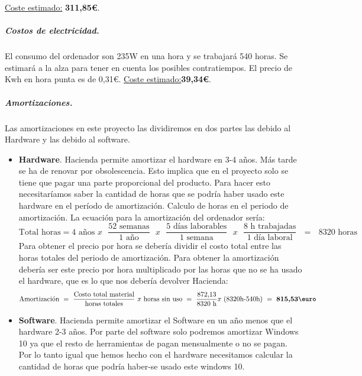 \documentclass[12pt]{article}
\begin{document}
    \underline{Coste estimado:} \textbf{311,85\euro}.
    \subparagraph{Costos de electricidad.} El consumo del ordenador son 235W en una hora y se trabajará 540 horas. Se estimará a la alza para tener en cuenta los posibles contratiempos. El precio de Kwh en hora punta es de 0,31\euro. \underline{Coste estimado:}\textbf{39,34\euro}.
    \subparagraph{Amortizaciones.}
    Las amortizaciones en este proyecto las dividiremos en dos partes las debido al Hardware y las debido al software. 
    \begin{itemize}
            \item \textbf{Hardware}. Hacienda permite amortizar el hardware en 3-4 años. Más tarde se ha de renovar por obsolescencia. Esto implica que en el proyecto solo se tiene que pagar una parte proporcional del producto. Para hacer esto necesitaríamos saber la cantidad de horas que se podría haber usado este hardware en el período de amortización. Calculo de horas en el periodo de amortización.
            La ecuación para la amortización del ordenador sería:
            \begin{equation*}
                \text{Total horas} = \text{4 años }  x\text{ }  \frac{\text{52 semanas}}{\text{1 año}} \text{ }x\text{ } \frac{\text{5 días laborables}}{\text{1 semana}} \text{ }x\text{ } \frac{\text{8 h trabajadas}}{\text{1 día laboral}} \text{ }=\text{ } 8320 \text{ horas} 
            \end{equation*}
            Para obtener el precio por hora se debería dividir el costo total entre las horas totales del periodo de amortización. Para obtener la amortización debería ser este precio por hora multiplicado por las horas que no se ha usado el hardware, que es lo que nos debería devolver Hacienda:
            \begin{equation*}
                \text{Amortización } = \text{ }  \frac{\text{Costo total material}}{\text{horas totales}}\text{ }x\text{ horas sin uso} \text{ }=\text{ } \frac{\text{872,13}}{\text{8320 h}}x\text{ (8320h-540h)} \text{ }= \text{ \textbf{815,53\euro}}
            \end{equation*}
         \item \textbf{Software}. Hacienda permite amortizar el Software en un año menos que el hardware 2-3 años. Por parte del software solo podremos amortizar Windows 10 ya que el resto de herramientas de pagan mensualmente o no se pagan. Por lo tanto igual que hemos hecho con el hardware necesitamos calcular la cantidad de horas que podría haber-se usado este windows 10.

\end{itemize}
\end{document}
